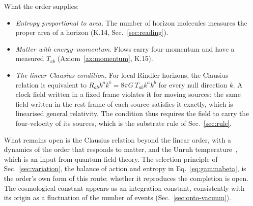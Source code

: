 What the order supplies:
\begin{itemize}
\item \emph{Entropy proportional to area.} The number of horizon molecules measures the proper area of a
  horizon (K.14, Sec.~\ref{sec:reading}).
\item \emph{Matter with energy--momentum.} Flows carry four-momentum and have a measured $T_{ab}$
  (Axiom~\ref{ax:momentum}, K.15).
\item \emph{The linear Clausius condition.} For local Rindler horizons, the Clausius relation is equivalent to
  $R_{ab}k^ak^b=8\pi G\,T_{ab}k^ak^b$ for every null direction $k$. A clock field written in a fixed frame
  violates it for moving sources; the same field written in the rest frame of each source satisfies it exactly,
  which is linearised general relativity. The condition thus requires the field to carry the four-velocity of
  its sources, which is the substrate rule of Sec.~\ref{sec:rule}.
\end{itemize}
What remains open is the Clausius relation beyond the linear order, with a dynamics of the order that responds
to matter, and the Unruh temperature~\cite{Unruh1976}, which is an input from quantum field theory. The selection
principle of Sec.~\ref{sec:variation}, the balance of action and entropy in Eq.~\eqref{eq:gammabeta}, is the
order's own form of this route; whether it reproduces the completion is open. The cosmological constant
appears as an integration constant, consistently with its origin as a fluctuation of the number of events
(Sec.~\ref{sec:onto-vacuum}).
